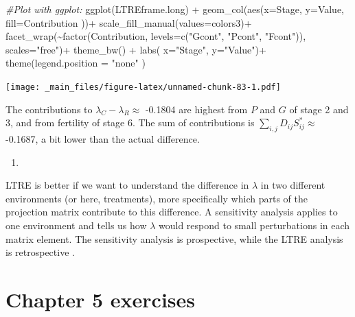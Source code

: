 \documentclass[
]{book}
\newenvironment{Shaded}{\begin{snugshade}}{\end{snugshade}}
\newcommand{\AttributeTok}[1]{\textcolor[rgb]{0.77,0.63,0.00}{#1}}
\newcommand{\CommentTok}[1]{\textcolor[rgb]{0.56,0.35,0.01}{\textit{#1}}}
\newcommand{\FunctionTok}[1]{\textcolor[rgb]{0.00,0.00,0.00}{#1}}
\newcommand{\NormalTok}[1]{#1}
\newcommand{\SpecialCharTok}[1]{\textcolor[rgb]{0.00,0.00,0.00}{#1}}
\newcommand{\StringTok}[1]{\textcolor[rgb]{0.31,0.60,0.02}{#1}}
\providecommand{\tightlist}{%
  \setlength{\itemsep}{0pt}\setlength{\parskip}{0pt}}
\begin{document}
\begin{Shaded}
\begin{Highlighting}[]
\CommentTok{\#Plot with ggplot:}
\FunctionTok{ggplot}\NormalTok{(LTREframe.long) }\SpecialCharTok{+} 
  \FunctionTok{geom\_col}\NormalTok{(}\FunctionTok{aes}\NormalTok{(}\AttributeTok{x=}\NormalTok{Stage, }\AttributeTok{y=}\NormalTok{Value, }
               \AttributeTok{fill=}\NormalTok{Contribution ))}\SpecialCharTok{+}
  \FunctionTok{scale\_fill\_manual}\NormalTok{(}\AttributeTok{values=}\NormalTok{colors3)}\SpecialCharTok{+}
  \FunctionTok{facet\_wrap}\NormalTok{(}\SpecialCharTok{\textasciitilde{}}\FunctionTok{factor}\NormalTok{(Contribution, }
                     \AttributeTok{levels=}\FunctionTok{c}\NormalTok{(}\StringTok{"Gcont"}\NormalTok{, }\StringTok{"Pcont"}\NormalTok{, }\StringTok{"Fcont"}\NormalTok{)), }
             \AttributeTok{scales=}\StringTok{"free"}\NormalTok{)}\SpecialCharTok{+}
  \FunctionTok{theme\_bw}\NormalTok{() }\SpecialCharTok{+}
  \FunctionTok{labs}\NormalTok{( }\AttributeTok{x=}\StringTok{"Stage"}\NormalTok{, }\AttributeTok{y=}\StringTok{"Value"}\NormalTok{)}\SpecialCharTok{+}
  \FunctionTok{theme}\NormalTok{(}\AttributeTok{legend.position =} \StringTok{"none"}\NormalTok{ ) }
\end{Highlighting}
\end{Shaded}

\texttt{[image: \_main\_files/figure-latex/unnamed-chunk-83-1.pdf]}

The contributions to \(\lambda_C-\lambda_R\approx\) -0.1804 are highest from \(P\) and \(G\) of stage 2 and 3, and from fertility of stage 6. The sum of contributions is \(\sum_{i,j}D_{ij}S^*_{ij}\approx\) -0.1687, a bit lower than the actual difference.

\begin{enumerate}
\def\labelenumi{\arabic{enumi}.}
\setcounter{enumi}{4}
\tightlist
\item
\end{enumerate}

LTRE is better if we want to understand the difference in \(\lambda\) in two different environments (or here, treatments), more specifically which parts of the projection matrix contribute to this difference. A sensitivity analysis applies to one environment and tells us how \(\lambda\) would respond to small perturbations in each matrix element. The sensitivity analysis is prospective, while the LTRE analysis is retrospective \citep{Caswell1}.

\hypertarget{chapter-5-exercises}{%
\section{Chapter 5 exercises}\label{chapter-5-exercises}}
\end{document}
